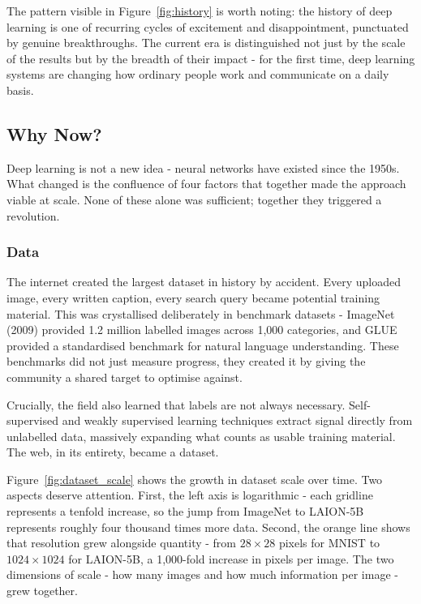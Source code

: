 The pattern visible in Figure~\ref{fig:history} is worth noting: the history of deep learning is one of recurring cycles of excitement and disappointment, punctuated by genuine breakthroughs. The current era is distinguished not just by the scale of the results but by the breadth of their impact - for the first time, deep learning systems are changing how ordinary people work and communicate on a daily basis.

\subsection{Why Now?}

Deep learning is not a new idea - neural networks have existed since the 1950s. What changed is the confluence of four factors that together made the approach viable at scale. None of these alone was sufficient; together they triggered a revolution.

\subsubsection{Data}

The internet created the largest dataset in history by accident. Every uploaded image, every written caption, every search query became potential training material. This was crystallised deliberately in benchmark datasets - ImageNet (2009) provided 1.2 million labelled images across 1,000 categories, and GLUE provided a standardised benchmark for natural language understanding. These benchmarks did not just measure progress, they created it by giving the community a shared target to optimise against.

Crucially, the field also learned that labels are not always necessary. Self-supervised and weakly supervised learning techniques extract signal directly from unlabelled data, massively expanding what counts as usable training material. The web, in its entirety, became a dataset.

Figure~\ref{fig:dataset_scale} shows the growth in dataset scale over time. Two aspects deserve attention. First, the left axis is logarithmic - each gridline represents a tenfold increase, so the jump from ImageNet to LAION-5B represents roughly four thousand times more data. Second, the orange line shows that resolution grew alongside quantity - from $28 \times 28$ pixels for MNIST to $1024 \times 1024$ for LAION-5B, a 1,000-fold increase in pixels per image. The two dimensions of scale - how many images and how much information per image - grew together.

